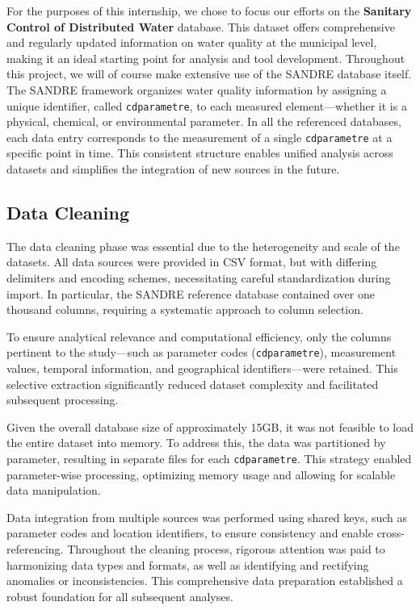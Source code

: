 \documentclass{article}
\begin{document}
For the purposes of this internship, we chose to focus our efforts on the \textbf{Sanitary Control of Distributed Water} database. 
This dataset offers comprehensive and regularly updated information on water quality at the municipal level, 
making it an ideal starting point for analysis and tool development.
Throughout this project, we will of course make extensive use of the SANDRE database itself. 
The SANDRE framework organizes water quality information by assigning a unique identifier, called \texttt{cdparametre}, 
to each measured element—whether it is a physical, chemical, or environmental parameter. In all the referenced databases, 
each data entry corresponds to the measurement of a single \texttt{cdparametre} at a specific point in time. 
This consistent structure enables unified analysis across datasets and simplifies the integration of new sources in the future.
\subsection{Data Cleaning}
The data cleaning phase was essential due to the heterogeneity and scale of the datasets. 
All data sources were provided in CSV format, but with differing delimiters and encoding schemes, 
necessitating careful standardization during import. In particular, the SANDRE reference database contained over one thousand columns, 
requiring a systematic approach to column selection.

To ensure analytical relevance and computational efficiency, only the columns pertinent to the study—such as parameter codes 
(\texttt{cdparametre}), measurement values, temporal information, and geographical identifiers—were retained. 
This selective extraction significantly reduced dataset complexity and facilitated subsequent processing.

Given the overall database size of approximately 15GB, it was not feasible to load the entire dataset into memory. To address this, 
the data was partitioned by parameter, resulting in separate files for each \texttt{cdparametre}. 
This strategy enabled parameter-wise processing, optimizing memory usage and allowing for scalable data manipulation.

Data integration from multiple sources was performed using shared keys, such as parameter codes and location identifiers, 
to ensure consistency and enable cross-referencing. Throughout the cleaning process, rigorous attention was paid to harmonizing data types 
and formats, as well as identifying and rectifying anomalies or inconsistencies. This comprehensive data preparation established 
a robust foundation for all subsequent analyses.
\end{document}
